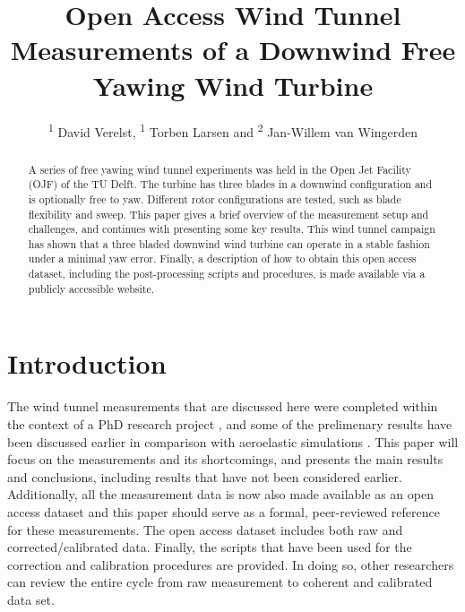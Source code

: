 \documentclass[a4paper]{jpconf}
\begin{document}
\title{Open Access Wind Tunnel Measurements of a Downwind Free Yawing Wind Turbine}

\author{\textsuperscript{1} David Verelst, \textsuperscript{1} Torben Larsen and \textsuperscript{2} Jan-Willem van Wingerden}

\address{\textsuperscript{1} DTU Wind Energy - Loads and Control, \textsuperscript{2} TU Delft - Delft Center for Systems and Control}




\begin{abstract}
A series of free yawing wind tunnel experiments was held in the Open Jet Facility (OJF) of the TU Delft. The turbine has three blades in a downwind configuration and is optionally free to yaw. Different rotor configurations are tested, such as blade flexibility and sweep. This paper gives a brief overview of the measurement setup and challenges, and continues with presenting some key results. This wind tunnel campaign has shown that a three bladed downwind wind turbine can operate in a stable fashion under a minimal yaw error. Finally, a description of how to obtain this open access dataset, including the post-processing scripts and procedures, is made available via a publicly accessible website.
\end{abstract}


\section{Introduction}

The wind tunnel measurements that are discussed here were completed within the context of a PhD research project \cite{verelst_numerical_2013:diss}, and some of the prelimenary results have been discussed earlier in comparison with aeroelastic simulations \cite{verelst_wind_2014}. This paper will focus on the measurements and its shortcomings, and presents the main results and conclusions, including results that have not been considered earlier. Additionally, all the measurement data is now also made available as an open access dataset and this paper should serve as a formal, peer-reviewed reference for these measurements. The open access dataset includes both raw and corrected/calibrated data. Finally, the scripts that have been used for the correction and calibration procedures are provided. In doing so, other researchers can review the entire cycle from raw measurement to coherent and calibrated data set.
\end{document}
